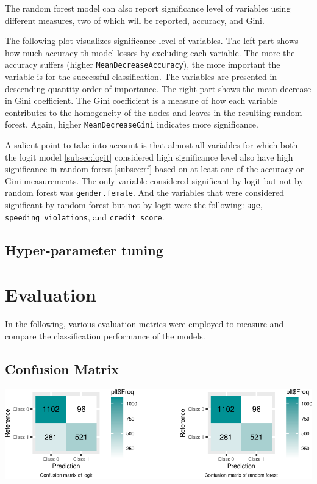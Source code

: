 \documentclass{article}
\begin{document}
The random forest model can also report significance level of variables
using different measures, two of which will be reported, accuracy, and
Gini.

The following plot visualizes significance level of variables. The left
part shows how much accuracy th model losses by excluding each variable.
The more the accuracy suffers (higher \texttt{MeanDecreaseAccuracy}),
the more important the variable is for the successful classification.
The variables are presented in descending quantity order of importance.
The right part shows the mean decrease in Gini coefficient. The Gini
coefficient is a measure of how each variable contributes to the
homogeneity of the nodes and leaves in the resulting random forest.
Again, higher \texttt{MeanDecreaseGini} indicates more significance.

A salient point to take into account is that almost all variables for
which both the logit model \ref{subsec:logit} considered high
significance level also have high significance in random forest
\ref{subsec:rf} based on at least one of the accuracy or Gini
measurements. The only variable considered significant by logit but not
by random forest was \texttt{gender.female}. And the variables that were
considered significant by random forest but not by logit were the
following: \texttt{age}, \texttt{speeding\_violations}, and
\texttt{credit\_score}.

\hypertarget{hyper-parameter-tuning}{%
\subsection{Hyper-parameter tuning}\label{hyper-parameter-tuning}}

\hypertarget{evaluation}{%
\section{\texorpdfstring{Evaluation
\label{sec:evaluation}}{Evaluation }}\label{evaluation}}

In the following, various evaluation metrics were employed to measure
and compare the classification performance of the models.

\hypertarget{confusion-matrix}{%
\subsection{Confusion Matrix}\label{confusion-matrix}}

\includegraphics{report_files/figure-latex/unnamed-chunk-15-1.pdf}
\end{document}
